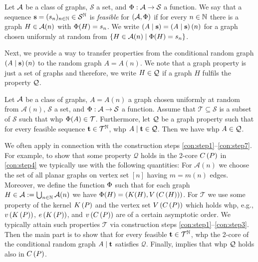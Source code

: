 \begin{definition}
Let $\mathcal{A}$ be a class of graphs, $\mathcal{S}$ a set, and $\Phi:\mathcal{A}\to \mathcal{S}$ a function. We say that a sequence $\mathbf{s}=(s_n)_{n\in \mathbb{N}} \in \mathcal{S}^{\mathbb{N}}$ is {\em feasible} for $\left(\mathcal{A}, \Phi\right)$ if for every $n \in \mathbb{N}$ there is a graph $H \in \mathcal{A}(n)$ with $\Phi(H)=s_n$. We write $\left(A \mid \mathbf{s}\right)=\left(A \mid \mathbf{s}\right)(n)$ for a graph chosen uniformly at random from $\left\{H \in \mathcal{A}(n) \mid \Phi(H)=s_n\right\}$.
\end{definition}

Next, we provide a way to transfer properties from the conditional random graph $\left(A \mid \mathbf{s}\right)(n)$ to the random graph $A=A(n)$. We note that a graph property is just a set of graphs and therefore, we write $H\in \mathcal{Q}$ if a graph $H$ fulfils the property $\mathcal{Q}$.

\begin{lem}\label{lem:cond_graph}
Let $\mathcal{A}$ be a class of graphs, $A=A(n)$ a graph chosen uniformly at random from $\mathcal{A}(n)$, $\mathcal{S}$ a set, and $\Phi:\mathcal{A}\to \mathcal{S}$ a function. Assume that $\mathcal{T}\subseteq \mathcal{S}$ is a subset of $\mathcal{S}$ such that whp $\Phi(A)\in \mathcal{T}$. Furthermore, let $\mathcal{Q}$ be a graph property such that for every feasible sequence $\mathbf{t}\in \mathcal{T}^{\mathbb{N}}$, whp $A \mid \mathbf{t} \in \mathcal{Q}$. Then we have whp $A \in \mathcal{Q}$.
\end{lem}

We often apply  in connection with the construction steps \ref{con:step1}--\ref{con:step7}. For example, to show that some property $\mathcal{Q}$ holds in the 2-core $C\left(P\right)$ in \ref{con:step4} we typically use  with the following quantities: For $\mathcal{A}(n)$ we choose the set of all planar graphs on vertex set $[n]$ having $m=m(n)$ edges. Moreover, we define the function $\Phi$ such that for each graph $H\in \mathcal{A}:=\bigcup_{n\in\mathbb{N}}\mathcal{A}(n)$ we have $\Phi(H)=\left(K(H), V\left(C\left(H\right)\right)\right)$. For $\mathcal{T}$ we use some property of the kernel $K\left(P\right)$ and the vertex set $V\left(C\left(P\right)\right)$ which holds whp, e.g., $v\left({K\left(P\right)}\right)$, $e\left({K\left(P\right)}\right)$, and $v\left({C\left(P\right)}\right)$ are of a certain asymptotic order. We typically attain such properties $\mathcal{T}$ via construction steps \ref{con:step1}--\ref{con:step3}. Then the main part is to show that for every feasible $\mathbf{t}\in\mathcal{T}^{\mathbb{N}}$, whp the 2-core of the conditional random graph $A \mid \mathbf{t}$ satisfies $\mathcal{Q}$. Finally,  implies that whp $\mathcal{Q}$ holds also in $C\left(P\right)$.

